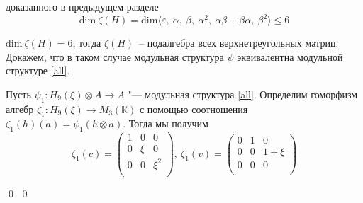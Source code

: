 \documentclass[12pt, reqno, a4paper, oneside, notitlepage]{amsart}
\makeatletter
\theoremstyle{mytheoremstyle}
\theoremstyle{myremarkstyle}
\numberwithin{equation}{section}
\renewenvironment{proof}[1][\proofname]{\par\indent {\bfseries #1\@addpunct{.} }}{\qed}
\makeatother
\begin{document}
\begin{proof}
\begin{proof}
	 доказанного в предыдущем разделе \[\mathrm{dim} \ \zeta(H) = \mathrm{dim} \langle\varepsilon,\ \alpha,\ \beta,\ \alpha^2,\ \alpha\beta+\beta\alpha,\ \beta^2 \rangle \leq 6\]

     $\mathrm{dim}\ \zeta(H) = 6$, тогда $\zeta(H)$~-- подалгебра всех верхнетреугольных матриц. Докажем, что в таком случае модульная структура $\psi$ эквивалентна модульной структуре \ref{all}.

    Пусть $\psi_1:H_9(\xi) \otimes A \to A$ "--- модульная структура \ref{all}.
    Определим гоморфизм алгебр $\zeta_1:H_9(\xi) \to M_3(\mathbb{K})$ с помощью соотношения ${\zeta_1(h)(a)=\psi_1(h \otimes a)}$.
    Тогда мы получим \[
    \zeta_1(c) = 
    \begin{pmatrix}
        1 & 0 & 0\\
        0 & \xi & 0\\
        0 & 0 & \xi^2\\
    \end{pmatrix},\ 
    \zeta_1(v) = 
    \begin{pmatrix}
        0 & 1 & 0\\
        0 & 0 & 1+\xi\\
        0 & 0 & 0\\
    \end{pmatrix}
    \]


\end{proof}
\end{proof}
\end{document}
